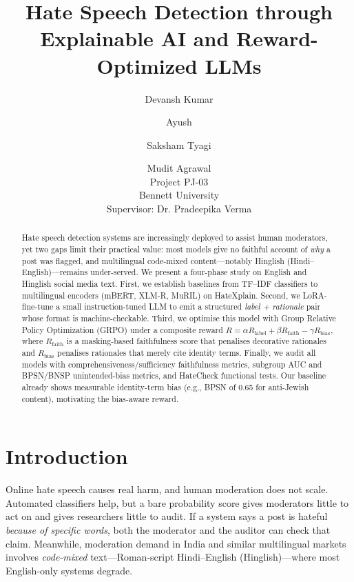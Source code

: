 \documentclass[11pt]{article}
\title{Hate Speech Detection through Explainable AI and Reward-Optimized LLMs}
\author{Devansh Kumar \and Ayush \and Saksham Tyagi \and Mudit Agrawal \\
  Project PJ-03 \\
  Bennett University \\
  Supervisor: Dr. Pradeepika Verma}
\begin{document}
\maketitle

\begin{abstract}
Hate speech detection systems are increasingly deployed to assist human
moderators, yet two gaps limit their practical value: most models give no
faithful account of \emph{why} a post was flagged, and multilingual
code-mixed content---notably Hinglish (Hindi--English)---remains
under-served. We present a four-phase study on English and Hinglish social
media text. First, we establish baselines from TF--IDF classifiers to
multilingual encoders (mBERT, XLM-R, MuRIL) on HateXplain. Second, we
LoRA-fine-tune a small instruction-tuned LLM to emit a structured
\emph{label + rationale} pair whose format is machine-checkable. Third, we
optimise this model with Group Relative Policy Optimization (GRPO) under a
composite reward $R = \alpha R_{\text{label}} + \beta R_{\text{faith}} -
\gamma R_{\text{bias}}$, where $R_{\text{faith}}$ is a masking-based
faithfulness score that penalises decorative rationales and
$R_{\text{bias}}$ penalises rationales that merely cite identity terms.
Finally, we audit all models with comprehensiveness/sufficiency faithfulness
metrics, subgroup AUC and BPSN/BNSP unintended-bias metrics, and HateCheck
functional tests. Our baseline already shows measurable identity-term bias
(e.g., BPSN of 0.65 for anti-Jewish content), motivating the bias-aware
reward. %
\end{abstract}

\section{Introduction}
Online hate speech causes real harm, and human moderation does not scale.
Automated classifiers help, but a bare probability score gives moderators
little to act on and gives researchers little to audit. If a system says a
post is hateful \emph{because of specific words}, both the moderator and the
auditor can check that claim. Meanwhile, moderation demand in India and
similar multilingual markets involves \emph{code-mixed} text---Roman-script
Hindi--English (Hinglish)---where most English-only systems degrade.
\end{document}
